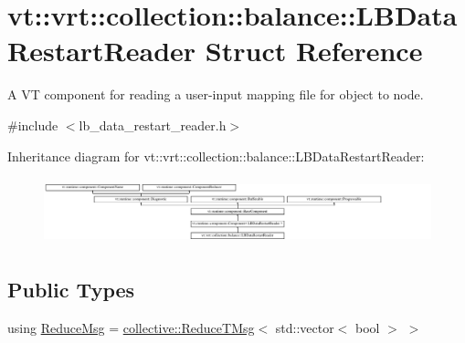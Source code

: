 \hypertarget{structvt_1_1vrt_1_1collection_1_1balance_1_1_l_b_data_restart_reader}{}\section{vt\+:\+:vrt\+:\+:collection\+:\+:balance\+:\+:L\+B\+Data\+Restart\+Reader Struct Reference}
\label{structvt_1_1vrt_1_1collection_1_1balance_1_1_l_b_data_restart_reader}


A VT component for reading a user-\/input mapping file for object to node.  




{\ttfamily \#include $<$lb\+\_\+data\+\_\+restart\+\_\+reader.\+h$>$}

Inheritance diagram for vt\+:\+:vrt\+:\+:collection\+:\+:balance\+:\+:L\+B\+Data\+Restart\+Reader\+:\begin{figure}[H]
\begin{center}
\leavevmode
\includegraphics[height=1.955307cm]{structvt_1_1vrt_1_1collection_1_1balance_1_1_l_b_data_restart_reader}
\end{center}
\end{figure}
\subsection*{Public Types}
\begin{DoxyCompactItemize}
\item 
using \hyperlink{structvt_1_1vrt_1_1collection_1_1balance_1_1_l_b_data_restart_reader_a59e2b9e568683c89c9af430adacba420}{Reduce\+Msg} = \hyperlink{namespacevt_1_1collective_a28b82d5d48c9bc6e4fd738fcbf9e0f62}{collective\+::\+Reduce\+T\+Msg}$<$ std\+::vector$<$ bool $>$ $>$
\end{DoxyCompactItemize}
